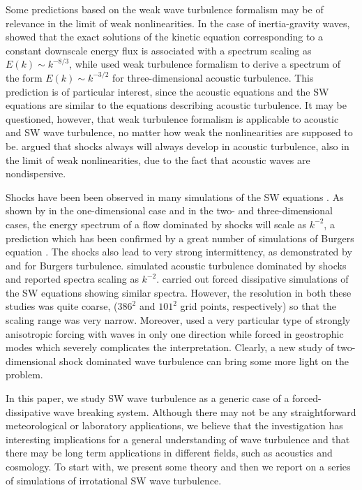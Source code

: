 Some predictions  based on the weak wave turbulence formalism
\cite[]{ZakharovLvovFalkovich1992, Nazarenko2011} may be of relevance in the limit of weak nonlinearities. In the case of
inertia-gravity waves, \cite{FalkovichMedvedev1992} showed that the exact
solutions of the kinetic equation corresponding to a constant downscale energy
flux is associated with a spectrum scaling as $E(k) \sim k^{-8/3}$, while
\cite{ZakharovSagdeev1970} used weak turbulence formalism to derive a spectrum
of the form $ E(k) \sim k^{-3/2} $ for three-dimensional acoustic turbulence. This prediction is
of particular interest, since the acoustic equations and the SW equations are similar 
to the equations describing acoustic turbulence. It may be questioned, however, that weak turbulence formalism is
applicable to acoustic and SW wave turbulence, no matter how weak the
nonlinearities are supposed to be.  \cite{KadomtsevPet1973} argued that shocks always will always develop in acoustic turbulence, also in the limit of weak nonlinearities, due to the fact that acoustic waves are nondispersive.

Shocks have been been observed in many simulations of the SW equations \cite[]{FargeSadourny1989,
PolvaniMcWilliamsSpallFord1994, LahayeZeitlin2012}. As shown by \cite{Burgers1948} in the one-dimensional case and \cite{Kuznetsov2004} in the two- and three-dimensional cases, the energy spectrum of a flow dominated by
shocks will scale as $ k^{-2} $, a prediction which has been confirmed by a
great number of simulations of Burgers equation \cite[for a review, see ]
[]{Frisch2001}. The shocks also lead to very strong intermittency, as
demonstrated by \cite{BouchaudMezardParisi1995} and
\cite{WeinanKhaninMazelSinai1997} for Burgers turbulence.
%
\cite{FalkovichMeyer1996} simulated acoustic turbulence dominated by shocks
and reported spectra scaling as $ k^{-2} $.
\cite{YuanHamilton1994} carried out
forced dissipative simulations of the SW equations showing similar spectra.
However, the resolution in both these studies was quite coarse, ($386^2$
and $101^2$ grid points, respectively) so that the scaling range was very
narrow.  Moreover, \cite{FalkovichMeyer1996} used a very particular
type of strongly anisotropic forcing with waves in only one
direction while \cite{YuanHamilton1994} forced in geostrophic modes
which severely complicates the interpretation. Clearly, a new study of two-dimensional shock dominated wave turbulence can bring some more light on the problem. 

In this paper, we study SW wave turbulence as a generic case of a forced-dissipative wave breaking system. Although there may not be any straightforward meteorological or laboratory applications,  we believe that the investigation has interesting implications for a general understanding of wave turbulence and that there may be long term applications in different fields, such as acoustics and cosmology.  To start with, we present some theory and then we report on a series of simulations of irrotational SW wave turbulence.


